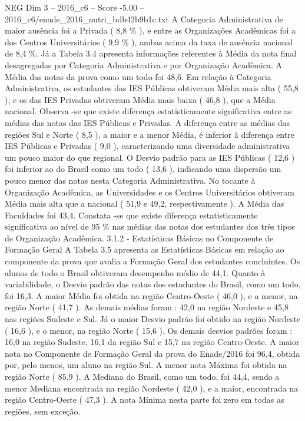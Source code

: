 \begin{textsample}{NEG Dim 3 – 2016\_c6 – Score -5.00 – 2016\_c6/enade\_2016\_nutri\_bdb42b9b1c.txt}
A Categoria Administrativa de maior ausência foi a Privada ( 8,8 \% ), e entre as Organizações Acadêmicas foi a dos Centros Universitários ( 9,9 \% ), ambas acima da taxa de ausência nacional de 8,4 \%.
Já a Tabela 3.4 apresenta informações referentes à Média da nota final desagregadas por Categoria Administrativa e por Organização Acadêmica.
A Média das notas da prova como um todo foi 48,6.
Em relação à Categoria Administrativa, os estudantes das IES Públicas obtiveram Média mais alta ( 55,8 ), e os das IES Privadas obtiveram Média mais baixa ( 46,8 ), que a Média nacional.
Observa -se que existe diferença estatisticamente significativa entre as médias das notas das IES Públicas e Privadas.
A diferença entre as médias das regiões Sul e Norte ( 8,5 ), a maior e a menor Média, é inferior à diferença entre IES Públicas e Privadas ( 9,0 ), caracterizando uma diversidade administrativa um pouco maior do que regional.
O Desvio padrão para as IES Públicas ( 12,6 ) foi inferior ao do Brasil como um todo ( 13,6 ), indicando uma dispersão um pouco menor das notas nesta Categoria Administrativa.
No tocante à Organização Acadêmica, as Universidades e os Centros Universitários obtiveram Média mais alta que a nacional ( 51,9 e 49,2, respectivamente ).
A Média das Faculdades foi 43,4.
Constata -se que existe diferença estatisticamente significativa ao nível de 95 \% nas médias das notas dos estudantes dos três tipos de Organização Acadêmica. 3.1.2 - Estatísticas Básicas no Componente de Formação Geral A Tabela 3.5 apresenta as Estatísticas Básicas em relação ao componente da prova que avalia a Formação Geral dos estudantes concluintes.
Os alunos de todo o Brasil obtiveram desempenho médio de 44,1.
Quanto à variabilidade, o Desvio padrão das notas dos estudantes do Brasil, como um todo, foi 16,3.
A maior Média foi obtida na região Centro-Oeste ( 46,0 ), e a menor, na região Norte ( 41,7 ).
As demais médias foram : 42,0 na região Nordeste e 45,8 nas regiões Sudeste e Sul.
Já o maior Desvio padrão foi obtido na região Nordeste ( 16,6 ), e o menor, na região Norte ( 15,6 ).
Os demais desvios padrões foram : 16,0 na região Sudeste, 16,1 da região Sul e 15,7 na região Centro-Oeste.
A maior nota no Componente de Formação Geral da prova do Enade/2016 foi 96,4, obtida por, pelo menos, um aluno na região Sul.
A menor nota Máxima foi obtida na região Norte ( 85,9 ).
A Mediana do Brasil, como um todo, foi 44,4, sendo a menor Mediana encontrada na região Nordeste ( 42,0 ), e a maior, encontrada na região Centro-Oeste ( 47,3 ).
A nota Mínima nesta parte foi zero em todas as regiões, sem exceção.

\end{textsample}
